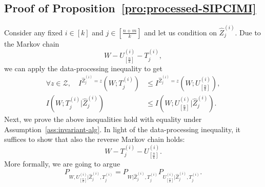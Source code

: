 \documentclass[onecolumn,romanappendices,10pt]{IEEEtran}
\newcommand{\Zcal}{{\mathcal Z}}
\begin{document}
	\subsection{Proof of Proposition~\ref{pro:processed-SIPCIMI}} \label{subapp:processed-SIPCIMI}
	Consider any fixed $i \in [k]$ and $j \in [\frac{n+m}{k}]$ and let us condition on $\hat{Z}^{(i)}_j$. Due to the Markov chain
	\begin{equation}\label{eq:W-U-T}
		W - U^{(i)}_{[\frac{n}{k}]} - T^{(i)}_j,
	\end{equation}
	we can apply the data-processing inequality to get 
	\begin{align}
		\forall z \in \Zcal, \quad I^{\hat{Z}^{(i)}_j = z}\left( W; T^{(i)}_j \right) &\leq I^{\hat{Z}^{(i)}_j = z}\left( W; U^{(i)}_{[\frac{n}{k}]} \right), \\
		I\left( W; T^{(i)}_j | \hat{Z}^{(i)}_j \right) &\leq I\left( W; U^{(i)}_{[\frac{n}{k}]} | \hat{Z}^{(i)}_j \right).
	\end{align}
	Next, we prove the above inequalities hold with equality under Assumption~\ref{ass:invariant-alg}. In light of the data-processing inequality, it suffices to show that also the reverse Markov chain holds:
	\begin{equation}
		W - T^{(i)}_j - U^{(i)}_{[\frac{n}{k}]}.
	\end{equation}
	More formally, we are going to argue
	\begin{equation}\label{eq:decp_WU-T}
		P_{W, U^{(i)}_{[\frac{n}{k}]} | \hat{Z}^{(i)}_j, T^{(i)}_j} = P_{W | \hat{Z}^{(i)}_j, T^{(i)}_j} P_{U^{(i)}_{[\frac{n}{k}]} | \hat{Z}^{(i)}_j, T^{(i)}_j}.
	\end{equation} 
	
\end{document}
